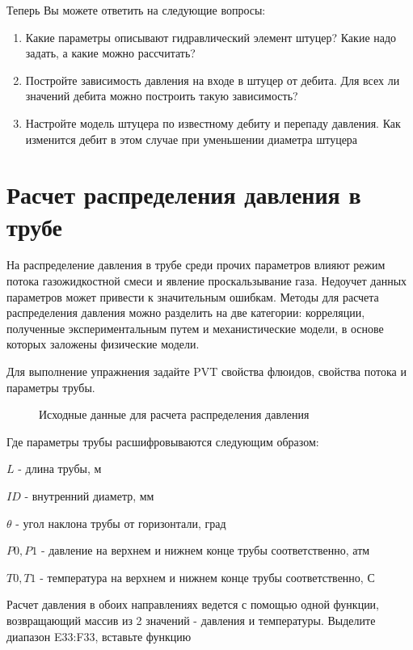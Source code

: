 Теперь Вы можете ответить на следующие вопросы:

\begin{enumerate}
	\item Какие параметры описывают гидравлический элемент штуцер? Какие надо задать, а какие можно рассчитать?
	\item Постройте зависимость давления на входе в штуцер от дебита. Для всех ли значений дебита можно построить такую зависимость?
	\item Настройте модель штуцера по известному дебиту и перепаду давления. Как изменится дебит в этом случае при уменьшении диаметра штуцера
\end{enumerate}




\section{Расчет распределения давления в трубе}

На распределение давления в трубе среди прочих параметров влияют режим потока газожидкостной смеси и явление проскальзывание газа. Недоучет данных параметров может привести к значительным ошибкам. Методы для расчета распределения давления можно разделить на две категории: корреляции, полученные экспериментальным путем и механистические модели, в основе которых заложены физические модели.

Для выполнение упражнения задайте PVT свойства флюидов, свойства потока и параметры трубы.

\begin{figure}[h!]
	\center{\texttt{[image: Ex50\_1]}}
	\caption{Исходные данные для расчета распределения давления}
	\label{ris:Ex50_1}
\end{figure}

Где параметры трубы расшифровываются следующим образом:

$L$ - длина трубы, м

$ID$ - внутренний диаметр, мм

$\theta$ - угол наклона трубы от горизонтали, град

$P0, P1$ - давление на верхнем и нижнем конце трубы соответственно, атм

$T0, T1$  - температура на верхнем и нижнем конце трубы соответственно, С

Расчет давления в обоих направлениях ведется с помощью одной функции, возвращающий массив из 2 значений - давления и температуры. Выделите диапазон E33:F33, вставьте функцию

